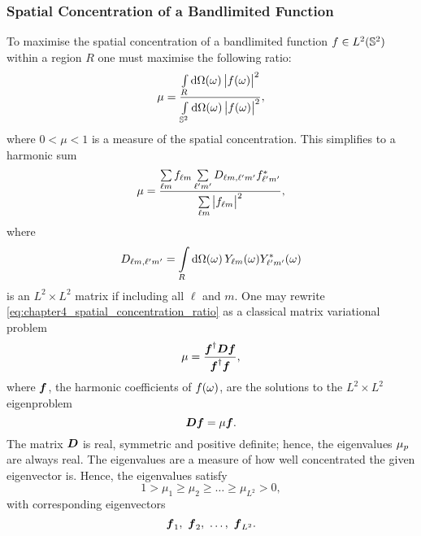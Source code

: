 

\subsubsection{Spatial Concentration of a Bandlimited Function}

To maximise the spatial concentration of a bandlimited function \(f \in \hilbert{\twoSphere}\) within a region \(R\) one must maximise the following ratio:
%
\begin{equation}
	\mu
	= \frac{\integrateRegion{\sphereVolume} \abs{\pixel{f}}^{2}}{\integrateSphere{\omega} \abs{\pixel{f}}^{2}},
\end{equation}
%
where \(0 < \mu < 1\) is a measure of the spatial concentration.
This simplifies to a harmonic sum
%
\begin{equation}\label{eq:chapter4_spatial_concentration_ratio}
	\mu
	= \frac{\harmonicSum \harmonic{f} \harmonicSum['] \Dmatrix \conj{\harmonic[']{f}}}{\harmonicSum \abs{\harmonic{f}}^{2}},
\end{equation}
%
where
%
\begin{equation}
	\Dmatrix
	= \integrateRegion{\sphereVolume} \pixel{\harmonic{Y}} \pixel{\conj{\harmonic[']{Y}}}
\end{equation}
%
is an \(L^{2} \times{} L^{2}\) matrix if including all \(\ell{}\) and \(m\).
One may rewrite \cref{eq:chapter4_spatial_concentration_ratio} as a classical matrix variational problem
%
\begin{equation}
	\mu
	= \frac{\hermitian{\vb*{f}} \vb*{D} \vb*{f}}{\hermitian{\vb*{f}}\vb*{f}},
\end{equation}
%
where \(\vb*{f}\), the harmonic coefficients of \(\pixel{f}\), are the solutions to the \(L^{2} \times{} L^{2}\) eigenproblem
%
\begin{equation}\label{eq:chapter4_eigenproblem}
	\vb*{D}\vb*{f}
	= \mu\vb*{f}.
\end{equation}
%
The matrix \(\vb*{D}\) is real, symmetric and positive definite; hence, the eigenvalues \(\slepian{\mu}\) are always real.
The eigenvalues are a measure of how well concentrated the given eigenvector is.
Hence, the eigenvalues satisfy
%
\begin{equation}
	1 > \mu_{1} \geq \mu_{2} \geq \ldots \geq \mu_{L^{2}} > 0, %
\end{equation}
%
with corresponding eigenvectors
%
\begin{equation}
	\vb*{f}_{1},\ \vb*{f}_{2},\ \ldots,\ \vb*{f}_{L^{2}}.
\end{equation}
